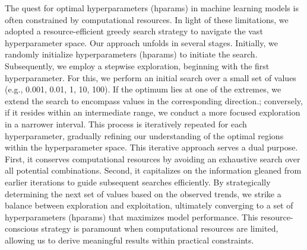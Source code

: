 The quest for optimal hyperparameters (hparams) in machine learning models is often constrained by computational resources. In light of these 
limitations, we adopted a resource-efficient greedy search strategy to navigate the vast hyperparameter space.
Our approach unfolds in several stages. Initially, we randomly initialize hyperparameters (hparams) to initiate the search. Subsequently, we employ 
a stepwise exploration, beginning with the first hyperparameter. For this, we perform an initial search over a small set of values 
(e.g., 0.001, 0.01, 1, 10, 100). If the optimum lies at one of the extremes, we extend the search to encompass values in the corresponding 
direction.; conversely, if it resides within an intermediate range, we conduct a more focused exploration in a narrower interval. 
This process is iteratively repeated for each hyperparameter, gradually refining our understanding of the optimal regions within the 
hyperparameter space.
This iterative approach serves a dual purpose. First, it conserves computational resources by avoiding an exhaustive search over all 
potential combinations. Second, it capitalizes on the information gleaned from earlier iterations to guide subsequent searches efficiently. 
By strategically determining the next set of values based on the observed trends, we strike a balance between exploration and exploitation, 
ultimately converging to a set of hyperparameters (hparams) that maximizes model performance. This resource-conscious strategy is paramount when 
computational resources are limited, allowing us to derive meaningful results within practical constraints.

